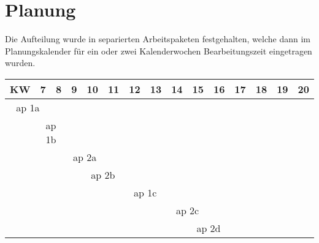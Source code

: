 \section{Planung}
Die Aufteilung wurde in separierten Arbeitspaketen festgehalten, welche dann im Planungskalender für ein oder zwei Kalenderwochen Bearbeitungszeit eingetragen wurden.\\
\begin{tabularx}{\linewidth}{|X|X|X|X|X|X|X|X|X|X|X|X|X|X|X|}
	\hline
	KW & 7 & 8 & 9 & 10 & 11 & 12 & 13 & 14 & 15 & 16 & 17 & 18 & 19 & 20\\\hline
	\multicolumn{2}{c}{\cellcolor{blue!25}\gls{ap} 1a} &&&&&&&&&&&&&\\\hline
	& \multicolumn{2}{c}{\cellcolor{blue!25}\gls{ap} 1b} &&&&&&&&&&&&\\\hline
	&&& \multicolumn{2}{c}{\cellcolor{blue!25}\gls{ap} 2a} &&&&&&&&&&\\\hline
	&&&& \multicolumn{2}{c}{\cellcolor{blue!25}\gls{ap} 2b} &&&&&&&&&\\\hline
	&&&&&& \multicolumn{2}{c}{\cellcolor{blue!25}\gls{ap} 1c} &&&&&&&\\\hline
	&&&&&&&& \multicolumn{2}{c}{\cellcolor{blue!25}\gls{ap} 2c} &&&&&\\\hline
	&&&&&&&&& \multicolumn{2}{c}{\cellcolor{blue!25}\gls{ap} 2d} &&&&\\\hline
\end{tabularx}


